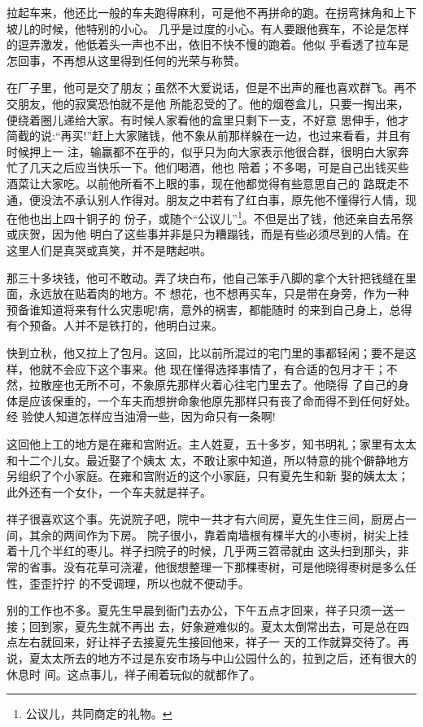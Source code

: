 \documentclass[11pt,a4paper,onecolumn]{article}
\begin{document}
拉起车来，他还比一般的车夫跑得麻利，可是他不再拼命的跑。在拐弯抹角和上下坡儿的时候，他特别的小心。
几乎是过度的小心。有人要跟他赛车，不论是怎样的逗弄激发，他低着头一声也不出，依旧不快不慢的跑着。他似
乎看透了拉车是怎回事，不再想从这里得到任何的光荣与称赞。

在厂子里，他可是交了朋友；虽然不大爱说话，但是不出声的雁也喜欢群飞。再不交朋友，他的寂寞恐怕就不是他
所能忍受的了。他的烟卷盒儿，只要一掏出来，便绕着圈儿递给大家。有时候人家看他的盒里只剩下一支，不好意
思伸手，他才简截的说:``再买!''赶上大家赌钱，他不象从前那样躲在一边，也过来看看，并且有时候押上一
注，输赢都不在乎的，似乎只为向大家表示他很合群，很明白大家奔忙了几天之后应当快乐一下。他们喝酒，他也
陪着；不多喝，可是自己出钱买些酒菜让大家吃。以前他所看不上眼的事，现在他都觉得有些意思\myrule 自己的
路既走不通，便没法不承认别人作得对。朋友之中若有了红白事，原先他不懂得行人情，现在他也出上四十铜子的
份子，或随个``公议儿''\footnote{公议儿，共同商定的礼物。}。不但是出了钱，他还亲自去吊祭或庆贺，因为他
明白了这些事并非是只为糟蹋钱，而是有些必须尽到的人情。在这里人们是真哭或真笑，并不是瞎起哄。

那三十多块钱，他可不敢动。弄了块白布，他自己笨手八脚的拿个大针把钱缝在里面，永远放在贴着肉的地方。不
想花，也不想再买车，只是带在身旁，作为一种预备\myrule 谁知道将来有什么灾患呢!病，意外的祸害，都能随时
的来到自己身上，总得有个预备。人并不是铁打的，他明白过来。

快到立秋，他又拉上了包月。这回，比以前所混过的宅门里的事都轻闲；要不是这样，他就不会应下这个事来。他
现在懂得选择事情了，有合适的包月才干；不然，拉散座也无所不可，不象原先那样火着心往宅门里去了。他晓得
了自己的身体是应该保重的，一个车夫而想拚命\myrule 象他原先那样\myrule 只有丧了命而得不到任何好处。经
验使人知道怎样应当油滑一些，因为命只有一条啊!

这回他上工的地方是在雍和宫附近。主人姓夏，五十多岁，知书明礼；家里有太太和十二个儿女。最近娶了个姨太
太，不敢让家中知道，所以特意的挑个僻静地方另组织了个小家庭。在雍和宫附近的这个小家庭，只有夏先生和新
娶的姨太太；此外还有一个女仆，一个车夫\myrule 就是祥子。

祥子很喜欢这个事。先说院子吧，院中一共才有六间房，夏先生住三间，厨房占一间，其余的两间作为下房。
院子很小，靠着南墙根有棵半大的小枣树，树尖上挂着十几个半红的枣儿。祥子扫院子的时候，几乎两三笤帚就由
这头扫到那头，非常的省事。没有花草可浇灌，他很想整理一下那棵枣树，可是他晓得枣树是多么任性，歪歪拧拧
的不受调理，所以也就不便动手。

别的工作也不多。夏先生早晨到衙门去办公，下午五点才回来，祥子只须一送一接；回到家，夏先生就不再出
去，好象避难似的。夏太太倒常出去，可是总在四点左右就回来，好让祥子去接夏先生\myrule 接回他来，祥子一
天的工作就算交待了。再说，夏太太所去的地方不过是东安市场与中山公园什么的，拉到之后，还有很大的休息时
间。这点事儿，祥子闹着玩似的就都作了。
\end{document}
